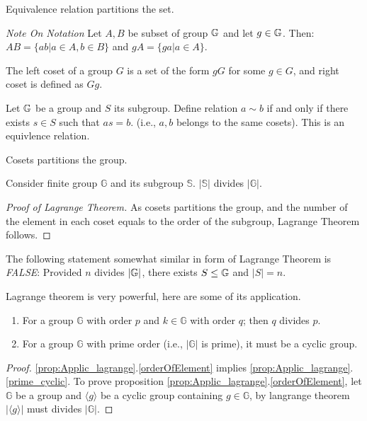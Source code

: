 \documentclass[../note.tex]{subfiles}
\begin{document}
\begin{theorem}
	Equivalence relation partitions the set.
\end{theorem}

\emph{Note On Notation}
Let $A, B$ be subset of group $\mathbb{G}$ and let $g \in \mathbb{G}$. Then:
$AB = \{ab|a\in A, b\in B\}$ and $gA = \{ga|a\in A\}$. 

\begin{definition}[Coset]
	The left coset of a group $G$ is a set of the form $gG$ for some $g\in G$, and right coset is defined as $Gg$.
\end{definition}

\begin{lemma}
	Let $\mathbb{G}$ be a group and $S$ its subgroup. Define relation $a \sim b$ if and only if there exists $s \in S$ such that $as = b$. (i.e., $a,b$ belongs to the same cosets). This is an equivlence relation.  
\end{lemma}

\begin{theorem}
Cosets partitions the group. 
\end{theorem}

\begin{theorem}
Consider finite group $\mathbb{G}$ and its subgroup $\mathbb{S}$. $|\mathbb{S}|$ divides $|\mathbb{G}|.$	
\end{theorem}


\begin{proof}[Proof of Lagrange Theorem]
	As cosets partitions the group, and the number of the element in each coset equals to the order of the subgroup, Lagrange Theorem follows.
\end{proof}

The following statement somewhat similar in form of Lagrange Theorem is \emph{FALSE}:
Provided  $n$ divides $  |\mathbb{G}|$, there exists $S \leq \mathbb{G}$ and $|S|=n$.

\begin{proposition}\label{prop:Applic_lagrange}
	Lagrange theorem is very powerful, here are some of its application.
\begin{enumerate}
	\item \label{orderOfElement}For a group $\mathbb{G}$ with order $p$ and $k \in \mathbb{G}$ with order $q$; then $q$ divides $p$.
	\item \label{prime_cyclic} For a group $\mathbb{G}$ with prime order (i.e., $|\mathbb{G}|$ is prime), it must be a cyclic group.
\end{enumerate}
\end{proposition}

\begin{proof}
	\ref{prop:Applic_lagrange}.\ref{orderOfElement} implies \ref{prop:Applic_lagrange}.\ref{prime_cyclic}.
	To prove proposition \ref{prop:Applic_lagrange}.\ref{orderOfElement}, let $\mathbb{G}$ be a group and $\langle g\rangle$ be a cyclic group containing $g \in \mathbb{G}$, by langrange theorem $|\langle g\rangle|$ must divides $|\mathbb{G}|$.
\end{proof}
\end{document}
